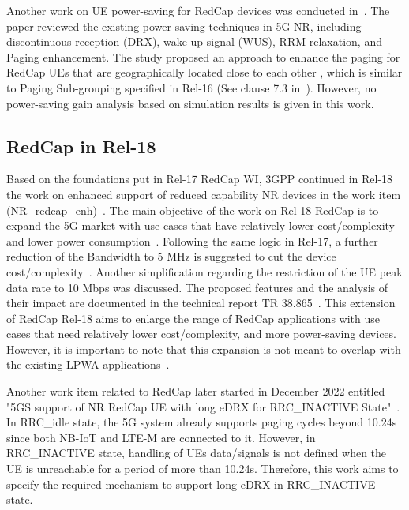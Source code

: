 \documentclass[]{IEEEtran}
\begin{document}
Another work on UE power-saving for RedCap devices was conducted in~\cite{li_radio_2022}. 
The paper reviewed the existing power-saving techniques in 5G NR, including discontinuous reception (DRX), wake-up signal (WUS), RRM relaxation, and Paging enhancement. 
The study proposed an approach to enhance the paging for RedCap UEs that are geographically located close to each other , which is similar to Paging Sub-grouping specified in Rel-16 (See clause 7.3 in~\cite{3gpp_study_nodate-4_38.804}). However, no power-saving gain analysis based on simulation results is given in this work.   

\subsection{RedCap in Rel-18}
Based on the foundations put in Rel-17 RedCap WI, 3GPP continued in Rel-18 the work on enhanced support of reduced capability NR devices in the work item (NR\_redcap\_enh)~\cite{3gpp_revised_2022_RP-223544}.
The main objective of the work on Rel-18 RedCap is to expand the 5G market with use cases that have relatively lower cost/complexity and lower power consumption~\cite{sandeep_narayanan_kadan_veedu_redcap_2023}. 
Following the same logic in Rel-17, a further reduction of the Bandwidth to 5 MHz is suggested to cut the device cost/complexity~\cite{3gpp_revised_2022_RP-223544}. 
Another simplification regarding the restriction of the UE peak data rate to 10 Mbps was discussed. The proposed features and the analysis of their impact are documented in the technical report TR 38.865~\cite{3gpp_study_2022_38.865}. This extension of RedCap Rel-18 aims to enlarge the range of RedCap applications with use cases that need relatively lower cost/complexity, and more power-saving devices. However, it is important to note that this expansion is not meant to overlap with the existing LPWA applications~\cite{3gpp_revised_2022_RP-223544}.

Another work item related to RedCap later started in December 2022 entitled "5GS support of NR RedCap UE with long eDRX for RRC\_INACTIVE State"~\cite{3gpp_5gs_2022_SP-220803}.
In RRC\_idle state, the 5G system already supports paging cycles beyond 10.24s since both NB-IoT and LTE-M are connected to it. 
However, in RRC\_INACTIVE state, handling of UEs data/signals is not defined when the UE is unreachable for a period of more than 10.24s.
Therefore, this work aims to specify the required mechanism to support long eDRX in RRC\_INACTIVE state.
\end{document}
